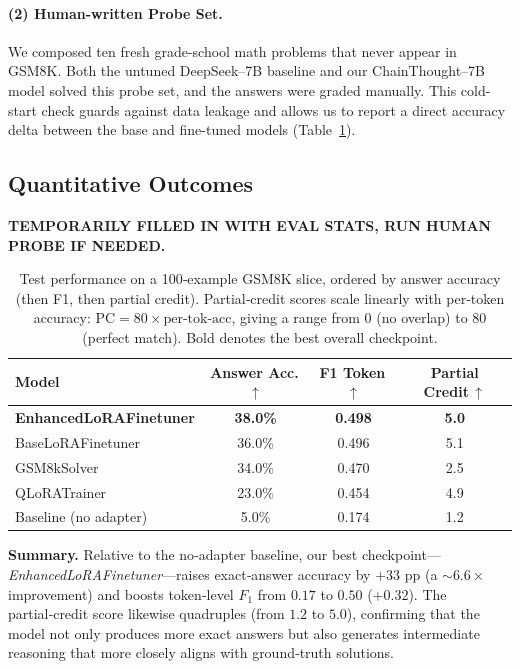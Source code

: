 \documentclass[11pt]{article}
\begin{document}
\paragraph{(2) Human-written Probe Set.}
We composed ten fresh grade-school math problems that never appear in GSM8K. Both the untuned DeepSeek--7B baseline and our ChainThought--7B model solved this probe set, and the answers were graded manually. This cold-start check guards against data leakage and allows us to report a direct accuracy delta between the base and fine-tuned models (Table~\ref{tab:results}).

\subsection{Quantitative Outcomes}

\textbf{TEMPORARILY FILLED IN WITH EVAL STATS, RUN HUMAN PROBE IF NEEDED.}

\begin{table}[h]
    \centering
    \small
    \begin{tabular}{lccc}
        \toprule
        \textbf{Model} & \textbf{Answer Acc.\,$\uparrow$} & \textbf{F1 Token\,$\uparrow$} & \textbf{Partial Credit\,$\uparrow$} \\
        \midrule
        \textbf{EnhancedLoRAFinetuner} & \textbf{38.0\%} & \textbf{0.498} & \textbf{5.0} \\
        BaseLoRAFinetuner              & 36.0\% & 0.496 & 5.1 \\
        GSM8kSolver                    & 34.0\% & 0.470 & 2.5 \\
        QLoRATrainer                   & 23.0\% & 0.454 & 4.9 \\
        Baseline (no adapter)          & 5.0\%  & 0.174 & 1.2 \\
        \bottomrule
    \end{tabular}
    \caption{Test performance on a 100‑example GSM8K slice, ordered by answer accuracy (then F1, then partial credit).  
    Partial‑credit scores scale linearly with per‑token accuracy: \(\text{PC}=80\times\text{per‑tok‑acc}\), giving a range from \(0\) (no overlap) to \(80\) (perfect match). Bold denotes the best overall checkpoint.}
    \label{tab:results}
\end{table}

\noindent
\textbf{Summary.}  Relative to the no‑adapter baseline, our best checkpoint—\emph{EnhancedLoRAFinetuner}—raises exact‑answer accuracy by \(+33\) pp (a \(\sim6.6\times\) improvement) and boosts token‑level \(F_{1}\) from \(0.17\) to \(0.50\) (\(+0.32\)).  The partial‑credit score likewise quadruples (from \(1.2\) to \(5.0\)), confirming that the model not only produces more exact answers but also generates intermediate reasoning that more closely aligns with ground‑truth solutions.
\end{document}
